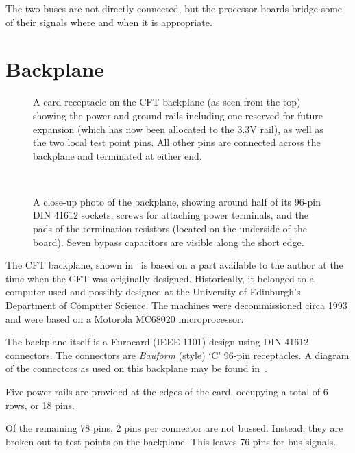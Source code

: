 The two buses are not directly connected, but the processor boards bridge some
of their signals where and when it is appropriate.

\section{Backplane}
\label{sec:backplane}

\begin{figure}
\centering
{}
\caption[A DIN41612 receptacle with power rails]{\label{fig:slot}A card
  receptacle on the CFT backplane (as seen from the top) showing the power and
  ground rails including one reserved for future expansion (which has now been
  allocated to the 3.3V rail), as well as the two local test point pins. All
  other pins are connected across the backplane and terminated at either end.
}
\end{figure}

\begin{figure}%
\centering%
\\
\caption[A photo of the CFT backplane.]{\label{photo:backplane}A close-up photo
  of the backplane, showing around half of its 96-pin DIN 41612 sockets, screws
  for attaching power terminals, and the pads of the termination resistors
  (located on the underside of the board). Seven bypass capacitors are visible
  along the short edge.
}
\end{figure}


The CFT backplane, shown in~ is based on a part available
to the author at the time when the CFT was originally designed. Historically,
it belonged to a computer used and possibly designed at the University of
Edinburgh's Department of Computer Science. The machines were decommissioned
circa 1993 and were based on a Motorola MC68020 microprocessor.

The backplane itself is a Eurocard (IEEE 1101) design using DIN 41612
connectors. The connectors are {\em Bauform\/} (style) ‘C’ 96-pin
receptacles. A diagram of the connectors as used on this backplane may be found
in~.

Five power rails are provided at the edges of the card, occupying a total of 6
rows, or 18 pins.

Of the remaining 78 pins, 2 pins per connector are not bussed. Instead, they
are broken out to test points on the backplane. This leaves 76 pins for bus
signals.

